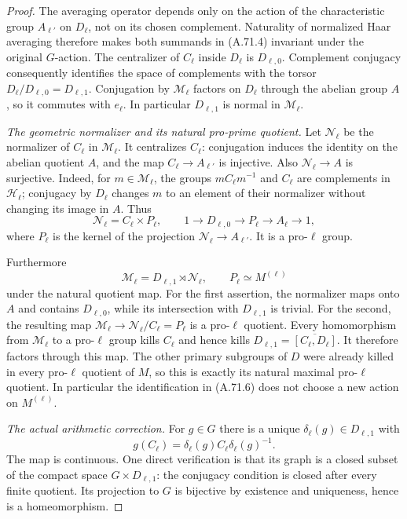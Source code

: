 \begin{proof}
The averaging operator depends only on the action of the
characteristic group $A_{\ell'}$ on $D_\ell$, not on its chosen
complement.  Naturality of normalized Haar averaging therefore
makes both summands in (A.71.4) invariant under the original
$G$-action.  The centralizer of $C_\ell$ inside $D_\ell$ is
$D_{\ell,0}$.  Complement conjugacy consequently identifies the
space of complements with the torsor
$D_\ell/D_{\ell,0}=D_{\ell,1}$.
Conjugation by $\mathcal M_\ell$ factors on $D_\ell$ through
the abelian group $A$, so it commutes with $e_\ell$.
In particular $D_{\ell,1}$ is normal in $\mathcal M_\ell$.

\emph{The geometric normalizer and its natural pro-prime quotient.}
Let $\mathcal N_\ell$ be the normalizer of $C_\ell$ in
$\mathcal M_\ell$.  It centralizes $C_\ell$: conjugation induces
the identity on the abelian quotient $A$, and the map
$C_\ell\to A_{\ell'}$ is injective.
Also $\mathcal N_\ell\to A$ is surjective.
Indeed, for $m\in\mathcal M_\ell$, the groups
$mC_\ell m^{-1}$ and $C_\ell$ are complements in
$\mathcal H_\ell$; conjugacy by $D_\ell$ changes $m$ to an
element of their normalizer without changing its image in $A$.
Thus
\[
 \mathcal N_\ell=C_\ell\times P_\ell,\qquad
 1\longrightarrow D_{\ell,0}\longrightarrow P_\ell
                     \longrightarrow A_\ell\longrightarrow1,
 \tag{A.71.5}
\]
where $P_\ell$ is the kernel of the projection
$\mathcal N_\ell\to A_{\ell'}$.
It is a pro-$\ell$ group.

Furthermore
\[
 \mathcal M_\ell=D_{\ell,1}\rtimes\mathcal N_\ell,\qquad
                      P_\ell\simeq M^{(\ell)}
 \tag{A.71.6}
\]
under the natural quotient map.
For the first assertion, the normalizer maps onto $A$ and contains
$D_{\ell,0}$, while its intersection with $D_{\ell,1}$ is trivial.
For the second, the resulting map
$\mathcal M_\ell\to\mathcal N_\ell/C_\ell=P_\ell$ is a pro-$\ell$
quotient.  Every homomorphism from $\mathcal M_\ell$ to a pro-$\ell$
group kills $C_\ell$ and hence kills
$D_{\ell,1}=\overline{[C_\ell,D_\ell]}$.
It therefore factors through this map.
The other primary subgroups of $D$ were already killed in every
pro-$\ell$ quotient of $M$, so this is exactly its natural maximal
pro-$\ell$ quotient.  In particular the identification in (A.71.6)
does not choose a new action on $M^{(\ell)}$.

\emph{The actual arithmetic correction.}
For $g\in G$ there is a unique $\delta_\ell(g)\in D_{\ell,1}$ with
\[
          g(C_\ell)=\delta_\ell(g)C_\ell\delta_\ell(g)^{-1}.
 \tag{A.71.7}
\]
The map is continuous.  One direct verification is that its graph
is a closed subset of the compact space $G\times D_{\ell,1}$:
the conjugacy condition is closed after every finite quotient.
Its projection to $G$ is bijective by existence and uniqueness,
hence is a homeomorphism.


\end{proof}
